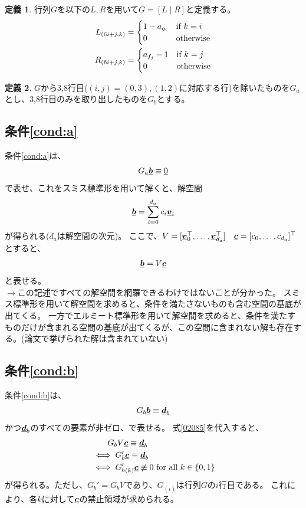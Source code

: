 \documentclass[a4paper,11pt,dvipdfmx]{jsarticle}
\theoremstyle{definition}
\newtheorem{definition}{定義}[section]
\begin{document}
\begin{definition}\label{def:02081}
  行列$G$を以下の$L,R$を用いて$G = [L\mid R]$と定義する。
\begin{align}
  L_{(6i+j, k)} &= \begin{cases}
    1-a_{g_i} & \text{if } k = i\\
    0 & \text{otherwise}
  \end{cases}\\
  R_{(6i+j, k)} &= \begin{cases}
    a_{f_j}-1 & \text{if } k = j\\
    0 & \text{otherwise}
  \end{cases}
\end{align}
\end{definition}

\begin{definition}\label{def:02082}
  $G$から3,8行目($(i,j)=(0,3),(1,2)$に対応する行)を除いたものを$G_a$とし、3,8行目のみを取り出したものを$G_b$とする。
\end{definition}

\subsection{条件\ref{cond:a}}
条件\ref{cond:a}は、
\begin{align}
  G_a \underline{\bm{b}} \equiv \underline{0}\label{02083}
\end{align}
で表せ、これをスミス標準形を用いて解くと、解空間
\begin{align}
  \underline{\bm{b}} = \sum_{i=0}^{d_a} c_i\underline{\bm{v}}_i\label{02084}
\end{align}
が得られる($d_a$は解空間の次元)。
ここで、$V=[\underline{\bm{v}}_0^\top,\dots,\underline{\bm{v}}_{d_a}^\top]\quad \underline{\bm{c}}=[c_0,\dots,c_{d_a}]^\top$とすると、
\begin{align}
  \underline{\bm{b}} = V\underline{\bm{c}}\label{02085}
\end{align}
と表せる。\\
$\rightarrow$この記述ですべての解空間を網羅できるわけではないことが分かった。
スミス標準形を用いて解空間を求めると、条件を満たさないものも含む空間の基底が出てくる。
一方でエルミート標準形を用いて解空間を求めると、条件を満たすものだけが含まれる空間の基底が出てくるが、この空間に含まれない解も存在する。(論文で挙げられた解は含まれていない)

\subsection{条件\ref{cond:b}}
条件\ref{cond:b}は、
\begin{align}
  G_b \underline{\bm{b}} \equiv \underline{\bm{d}}_b\label{02086}
\end{align}
かつ$\underline{\bm{d}}_b$のすべての要素が非ゼロ、で表せる。
式\eqref{02085}を代入すると、
\begin{align}
  &\qquad G_b V\underline{\bm{c}} \equiv \underline{\bm{d}}_b\label{02087}\\
  &\iff G_b'\underline{\bm{c}} \equiv \underline{\bm{d}}_b\label{02088}\\
  &\iff {G_b'}_{(k)}\underline{\bm{c}} \not\equiv 0\text{ for all }k \in \{0,1\}\label{02089}
\end{align}
が得られる。ただし、$G_b' = G_b V$であり、$G_{(i)}$は行列$G$の$i$行目である。
これにより、各$k$に対して$\underline{\bm{c}}$の禁止領域が求められる。
\end{document}
